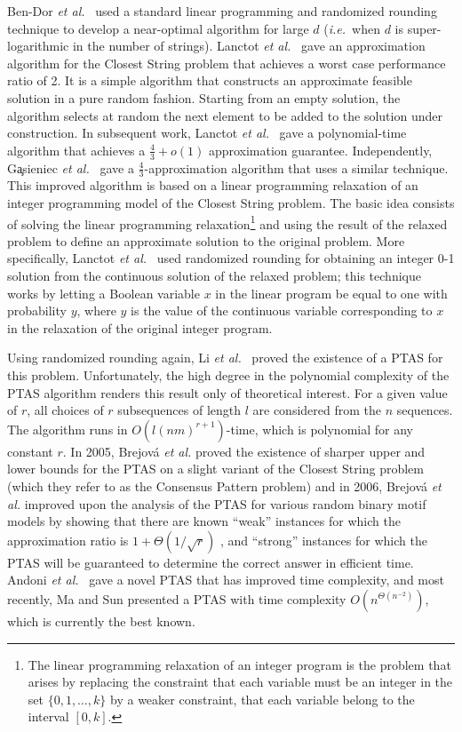 Ben-Dor {\em et al.}\ \cite{BLPR} used a standard linear programming and randomized rounding technique to develop a near-optimal algorithm for large $d$ ({\em i.e.}\ when $d$ is super-logarithmic in the number of strings).  Lanctot {\em et al.}\ \cite{LLMWZ00_v1} gave an approximation algorithm for the {\sc Closest String} problem that achieves a worst case performance ratio of 2.  It is a simple algorithm that constructs an approximate feasible solution in a pure random fashion.  Starting from an empty solution, the algorithm selects at random the next element to be added to the solution under construction.  In subsequent work, Lanctot {\em et al.}\ \cite{LLMWZ00} gave a polynomial-time algorithm that achieves a $\frac{4}{3} + o(1)$ approximation guarantee. Independently, G\c{a}sieniec {\em et al.}\ \cite{GJL} gave a $\frac{4}{3}$-approximation algorithm that uses a similar technique. This improved algorithm is based on a linear programming relaxation of an integer programming model of the {\sc Closest String} problem.   The basic idea consists of solving the linear programming relaxation\footnote{The linear programming relaxation of an integer program is the problem that arises by replacing the constraint that each variable must be an integer in the set $\{0, 1, \ldots, k\}$ by a weaker constraint, that each variable belong to the interval $[0,k]$.} and using the result of the relaxed problem to define an approximate solution to the original problem.   More specifically, Lanctot {\em et al.}\ \cite{LLMWZ00} used randomized rounding for obtaining an integer 0-1 solution from the continuous solution of the relaxed problem; this technique works by letting a Boolean variable $x$ in the linear program be equal to one with probability $y$, where $y$ is the value of the continuous variable corresponding to $x$ in the relaxation of the original integer program.  

Using randomized rounding again, Li {\em et al.}\ \cite{LMW02} proved the existence of a PTAS for this problem.  Unfortunately, the high degree in the polynomial complexity of the PTAS algorithm renders this result only of theoretical interest.  For a given value of $r$, all choices of $r$ subsequences of length $l$ are considered from the $n$ sequences. The algorithm runs in $O(l(nm)^{r + 1})$-time, which is polynomial for any constant $r$.  In 2005, Brejov\'{a} {\em et al.} \cite{brona1} proved the existence of sharper upper and lower bounds for the PTAS on a slight variant of the {\sc Closest String} problem (which they refer to as the {\sc Consensus Pattern} problem) and in 2006, Brejov\'{a} {\em et al.} \cite{brona2} improved upon the analysis of the PTAS for various random binary motif models by showing that there are known ``weak'' instances for which the approximation ratio is $1 + \Theta(1/ \sqrt{r})$ \cite{brona1}, and ``strong'' instances for which the PTAS will be guaranteed to determine the correct answer in efficient time.  Andoni {\em et al.}\ \cite{AIP} gave a novel PTAS that has improved time complexity, and most recently, Ma and Sun \cite{MS08} presented a PTAS with time complexity $O(n^{\Theta(n^{-2})})$, which is currently the best known. 

